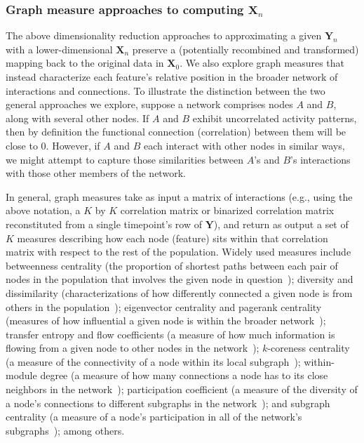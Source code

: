 \documentclass[english]{article}
\begin{document}
\subsubsection*{Graph measure approaches to computing
  $\mathbf{X}_n$}
The above dimensionality reduction approaches to approximating a given
$\mathbf{Y}_n$ with a lower-dimensional $\mathbf{X}_n$ preserve a
(potentially recombined and transformed) mapping back to the original
data in $\mathbf{X}_0$.  We also explore graph measures that instead
characterize each feature's relative position in the broader
network of interactions and connections.  To illustrate the
distinction between the two general approaches we explore, suppose a
network comprises nodes $A$ and $B$, along with several other nodes.  If $A$ and $B$ exhibit
uncorrelated activity patterns, then by definition the functional connection
(correlation) between them will be close to 0.
However, if $A$ and $B$ each interact with other nodes in similar ways, we
might attempt to capture those similarities between $A$'s and $B$'s
interactions with those other members of the network.

In general, graph measures take as input a matrix of
interactions (e.g., using the above notation, a $K$ by $K$
correlation matrix or binarized correlation matrix reconstituted from
a single timepoint's row of $\mathbf{Y}$), and return as output a set
of $K$ measures describing how each node (feature) sits within that
correlation matrix with respect to the rest of the population.  Widely
used measures include betweenness centrality (the proportion of
shortest paths between each pair of nodes in the population that
involves the given node in question~\cite{Newm05, OpsaEtal10,
  Bart04, GeisEtal08, Free77}); diversity and
dissimilarity (characterizations of how differently connected a
given node is from others in the population~\cite{Rao82, Lin09,
  RicoSzei06}); eigenvector centrality and pagerank
centrality (measures of how influential a given node is within
the broader network~\cite{Newm08, Bona07, LohmEtal10,
  HaluEtal13}); transfer entropy and flow coefficients (a measure
of how much information is flowing from a given node to other nodes in
the network~\cite{HoneEtal07, Schr00}); $k$-coreness
centrality (a measure of the connectivity of a node within its
local subgraph~\cite{AlvaEtal05, ChriFowl10}); within-module
degree (a measure of how many connections a node has to its
close neighbors in the network~\cite{RubiSpor10}); participation
coefficient (a measure of the diversity of a node's connections
to different subgraphs in the network~\cite{RubiSpor10}); and
subgraph centrality (a measure of a node's participation in all
of the network's subgraphs~\cite{EstrRodr05}); among others.
\end{document}

